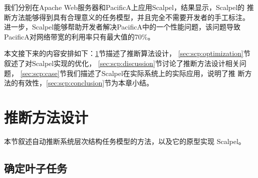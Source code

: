 我们分别在Apache Web服务器和PacificA上应用Scalpel，结果显示，Scalpel的
推断方法能够得到具有合理意义的任务模型，并且完全不需要开发者的手工标注。
进一步，Scalpel能够帮助开发者解决PacificA中的一个性能问题，该问题导致
PacificA对网络带宽的利用率只有最大值的70\%。

本文接下来的内容安排如下：\ref{sec:scp:design}节描述了推断算法设计，
\ref{sec:scp:optimization}节叙述了对Scalpel实现的优化，
\ref{sec:scp:discussion}节讨论了推断方法设计相关问题，
\ref{sec:scp:case}节我们描述了Scalpel在实际系统上的实际应用，说明了推
断方法的有效性，\ref{sec:scp:conclusion}节为本章小结。

\section{推断方法设计}
\label{sec:scp:design}

本节叙述自动推断系统层次结构任务模型的方法，以及它的原型实现
\pozhehao{}Scalpel。



\subsection{确定叶子任务}

